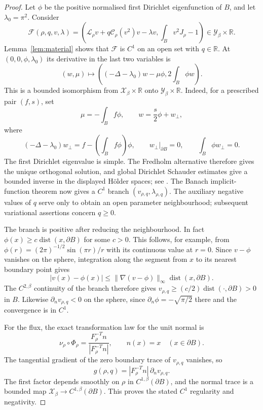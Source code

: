 \documentclass[11pt,a4paper]{article}
\theoremstyle{definition}
\theoremstyle{remark}
\begin{document}
\begin{proof}
Let $\phi$ be the positive normalised first Dirichlet eigenfunction of
$B$, and let $\lambda_0=\pi^2$.  Consider
\[
 \mathcal F(\rho,q,v,\lambda)=
 \left(\mathcal L_\rho v+q\mathcal C_\rho(v^2)v-\lambda v,
                     \int_Bv^2J_\rho-1\right)
       \in \mathcal Y_\beta\times\mathbb R.
\]
Lemma~\ref{lem:material} shows that $\mathcal F$ is $C^1$ on an open
set with $q\in\mathbb R$.  At $(0,0,\phi,\lambda_0)$ its derivative
in the last two variables is
\begin{equation}
 (w,\mu)\longmapsto
 \left(({-\Delta-\lambda_0})w-\mu\phi,
                         2\int_B\phi w\right).
 \label{eq:state-augmented-inverse}
\end{equation}
This is a bounded isomorphism from $\mathcal X_\beta\times\mathbb R$ onto
$\mathcal Y_\beta\times\mathbb R$.  Indeed, for a prescribed pair $(f,s)$,
set
\[
 \mu=-\int_B f\phi,\qquad w=\frac{s}{2}\phi+w_\perp,
\]
where
\[
 (-\Delta-\lambda_0)w_\perp
       =f-\left(\int_Bf\phi\right)\phi,
 \qquad w_\perp|_{\partial B}=0,
 \qquad\int_B\phi w_\perp=0.
\]
The first Dirichlet eigenvalue is simple.  The Fredholm alternative
therefore gives the unique orthogonal solution, and global Dirichlet
Schauder estimates give a bounded inverse in the displayed H\"older
spaces; see \cite[Chapter~6 and Theorem~8.38]{GT2001}.
The Banach implicit-function theorem now gives a $C^1$ branch
$(v_{\rho,q},\lambda_{\rho,q})$.  The auxiliary negative values of $q$
serve only to obtain an open parameter neighbourhood; subsequent
variational assertions concern $q\geq0$.

The branch is positive after reducing the neighbourhood.  In fact
$\phi(x)\geq c\operatorname{dist}(x,\partial B)$ for some $c>0$.
This follows, for example, from
$\phi(r)=(2\pi)^{-1/2}\sin(\pi r)/r$ with its continuous value at
$r=0$.  Since $v-\phi$ vanishes on the sphere, integration along the
segment from $x$ to its nearest boundary point gives
\[
 |v(x)-\phi(x)|\leq\|\nabla(v-\phi)\|_\infty
                         \operatorname{dist}(x,\partial B).
\]
The $C^{2,\beta}$ continuity of the branch therefore gives
$v_{\rho,q}\geq(c/2)\operatorname{dist}(\cdot,\partial B)>0$ in $B$.
Likewise $\partial_n v_{\rho,q}<0$ on the sphere, since
$\partial_n\phi=-\sqrt{\pi/2}$ there and the convergence is in $C^1$.

For the flux, the exact transformation law for the unit normal is
\[
 \nu_\rho\circ\Phi_\rho
       =\frac{F_\rho^{-T}n}{|F_\rho^{-T}n|},\qquad n(x)=x
       \quad(x\in\partial B).
\]
The tangential gradient of the zero boundary trace of $v_{\rho,q}$
vanishes, so
\begin{equation}
 g(\rho,q)=|F_\rho^{-T}n|\,\partial_n v_{\rho,q}.
 \label{eq:state-material-flux}
\end{equation}
The first factor depends smoothly on $\rho$ in $C^{1,\beta}(\partial B)$,
and the normal trace is a bounded map
$\mathcal X_\beta\to C^{1,\beta}(\partial B)$.  This proves the stated $C^1$
regularity and negativity.
\end{proof}
\end{document}
